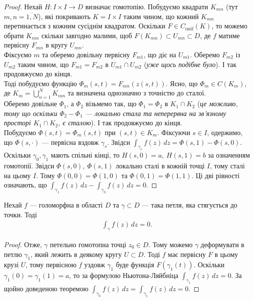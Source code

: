 \documentclass{math_library}
\begin{document}
\begin{proof}
Нехай $H \colon I \times I \to D$ визначає гомотопію. Побудуємо квадрати $K_{mn}$ (тут $m,n = \overline{1,N}$), які покривають $K = I \times I$ таким чином, що кожний $K_{mn}$ перетинається з кожним сусіднім квадратом. Оскільки $F \in C_{\text{unif}}(K)$, то можемо обрати $K_{mn}$ скільки завгодно малими, щоб $F(K_{mn}) \subset U_{mn} \subset D$, де $f$ матиме первісну $F_{mn}$ в кругу $U_{mn}$.\\
Фіксуємо $m$ та оберемо довільну первісну $F_{m1}$, що діє на $U_{m1}$. Оберемо $F_{m2}$ із $U_{m2}$ таким чином, що $F_{m1} = F_{m2}$ в $U_{m1} \cap U_{m2}$ (\textit{уже щось подібне було}). І так продовжуємо до кінця.\\
Тоді побудуємо функцію $\Phi_m(s,t) = F_{mn}(z(s,t))$. Ясно, що $\Phi_m \in C(K_m)$, де $K_m = \displaystyle\bigcup_{n=1}^N K_{mn}$ та визначена однозначно з точністю до сталої.\\
Оберемо довільне $\Phi_1$, а $\Phi_2$ візьмемо так, що $\Phi_1 = \Phi_2$ в $K_1 \cap K_2$ (\textit{це можливо, тому що оскільки $\Phi_2 - \Phi_1$ --- локально стала та неперервна на зв'язному просторі $K_1 \cap K_2$, є сталою}). І так продовжуємо до кінця.\\
Побудуємо $\Phi(s,t) = \Phi_m(s,t)$ при $(s,t) \in K_m$. Фіксуючи $s \in I$, одержимо, що $\Phi(s,\cdot)$ --- первісна вздовж $\gamma_s$. Звідси $\displaystyle\int_{\gamma_s} f(z)\,dz = \Phi(s,1) - \Phi(s,0)$.\\
Оскільки $\gamma_0,\gamma_1$ мають спільні кінці, то $H(s,0) = a,\ H(s,1) = b$ за означенням гомотопії. Звідси $\Phi(s,0),\ \Phi(s,1)$ локально сталі в кожній точці $I$, тому сталі на цьому $I$. Тому $\Phi(0,0) = \Phi(1,0)$ та $\Phi(0,1) = \Phi(1,1)$. Ці дві рівності означають, що $\displaystyle\int_{\gamma_1} f(z)\,dz - \int_{\gamma_0} f(z)\,dz = 0$.
\end{proof}

\begin{theorem}
Нехай $f$ --- голоморфна в області $D$ та $\gamma \subset D$ --- така петля, яка стягується до точки. Тоді
\begin{align*}
\int_\gamma f(z)\,dz = 0.
\end{align*}
\end{theorem}

\begin{proof}
Отже, $\gamma$ петельно гомотопна точці $z_0 \in D$. Тому можемо $\gamma$ деформувати в петлю $\gamma_1$, який лежить в деякому кругу $U \subset D$. Тоді $f$ має первісну $F$ в цьому крузі $U$, тому первісною $f$ уздовж $\gamma_1$ буде функція $F(\gamma_1(t))$. Оскільки $\gamma_1(0) = \gamma_1(1) = a$, то за формулою Ньютона-Ляйбніца $\displaystyle\int_{\gamma_1} f(z)\,dz = 0$. За щойно доведеною теоремою $\displaystyle\int_{\gamma_0} f(z)\,dz = \int_{\gamma_1} f(z)\,dz = 0$.
\end{proof}
\end{document}
